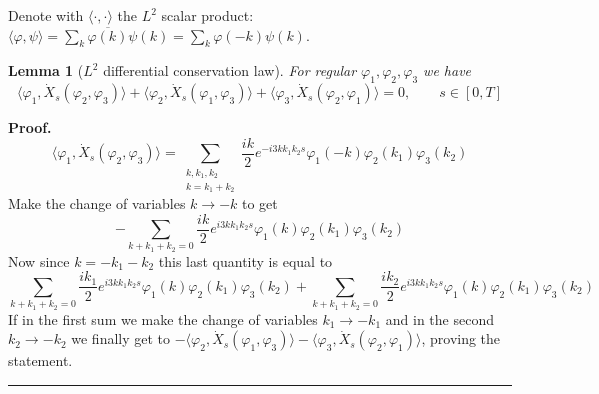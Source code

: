 \documentclass[a4paper,12pt,reqno]{article}
\newtheorem{lemma}[theorem]{Lemma}
\newenvironment{proof}[1][Proof]{\textbf{#1.} }{\ \rule{0.5em}{0.5em}}
\begin{document}
 
Denote with $\langle \cdot,\cdot \rangle$ the $L^2$ scalar product:
$
\langle \varphi,\psi \rangle = \sum_k \overline{\varphi(k)} \psi(k) =
\sum_k \varphi(-k) \psi(k)
$.

\begin{lemma}[$L^2$ differential conservation law]
For regular $\varphi_1,\varphi_2,\varphi_3$ we have
\label{lemma:basic-symmetry}
$$
\langle \varphi_1, \dot X_s(\varphi_2,\varphi_3)\rangle 
+\langle \varphi_2, \dot X_s(\varphi_1,\varphi_3)\rangle 
+\langle \varphi_3, \dot X_s(\varphi_2,\varphi_1)\rangle 
= 0, \qquad s \in[0,T]
$$  
\end{lemma}
\begin{proof}
  \begin{equation}
    \label{eq:cons-1}
\langle \varphi_1, \dot X_s(\varphi_2,\varphi_3)\rangle  =
\sum_{\substack{k,k_1,k_2\\ k=k_1+k_2}} \frac{ik}{2}e^{-i3k k_1 k_2
  s}  \varphi_{1}(-k)  \varphi_2(k_1) \varphi_3(k_2)
  \end{equation}
Make the change of variables $k \to -k$ to get
$$
- \sum_{k+k_1+k_2=0} \frac{ik}{2}e^{i3k k_1 k_2
  s}  \varphi_{1}(k)  \varphi_2(k_1) \varphi_3(k_2)
$$
Now since $k = -k_1-k_2$ this last quantity is equal to
$$
 \sum_{k+k_1+k_2=0} \frac{ik_1}{2}e^{i3k k_1 k_2
  s}  \varphi_{1}(k)  \varphi_2(k_1) \varphi_3(k_2)
+ \sum_{k+k_1+k_2=0} \frac{ik_2}{2}e^{i3k k_1 k_2
  s}  \varphi_{1}(k)  \varphi_2(k_1) \varphi_3(k_2)
$$
If 
in the first sum we make the change of variables $k_1 \to -k_1$ and in
the second $k_2 \to -k_2$ we finally get to
$
- \langle \varphi_2, \dot X_s(\varphi_1,\varphi_3)\rangle - \langle \varphi_3, \dot X_s(\varphi_2,\varphi_1)\rangle
$,
proving the statement.
\end{proof}
\end{document}
